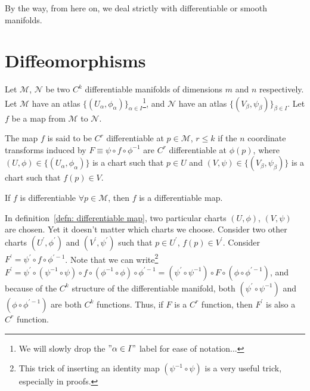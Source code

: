     By the way, from here on, we deal strictly with differentiable or smooth manifolds.
  \section{Diffeomorphisms}
    \label{sec: Diffeomorphism}
    \begin{definition}
      \label{defn: differentiable map}
      Let $\mathcal{M}$, $\mathcal{N}$ be two $C^k$ differentiable
      manifolds of dimensions $m$ and $n$ respectively. Let $\mathcal{M}$
      have an atlas $\{(U_\alpha, \phi_\alpha)\}_{\alpha\in I}$\footnote{We
      will slowly drop the $"\alpha\in I"$ label for ease of notation...},
      and $\mathcal{N}$ have an atlas $\{(V_\beta, \psi_\beta)\}_{\beta\in
      I}$. Let $f$ be a map from $\mathcal{M}$ to $\mathcal{N}$.
      
      The map $f$ is said to be $C^r$ differentiable at $p\in\mathcal{M}$,
      $r\leq k$ if the $n$ coordinate transforms induced by $F \equiv \psi
      \circ f \circ \phi^{-1}$ are $C^r$ differentiable at $\phi(p)$, where
      $(U,\phi) \in \{(U_\alpha, \phi_\alpha)\}$ is a chart such that $p
      \in U$ and $(V,\psi) \in \{(V_\beta, \psi_\beta)\}$ is a chart such
      that $f(p) \in V$.
      
      If $f$ is differentiable $\forall p \in \mathcal{M}$, then $f$ is a
      differentiable map.
    \end{definition}
    \begin{remark}
      In definition~\ref{defn: differentiable map}, two particular charts
      $(U,\phi)$, $(V,\psi)$ are chosen. Yet it doesn't matter which charts
      we choose. Consider two other charts $(U^\prime,\phi^\prime)$ and
      $(V^\prime,\psi^\prime)$ such that $p \in U^\prime$, $f(p) \in
      V^\prime$. Consider $F^\prime = \psi^\prime \circ f \circ
      \phi^{\prime -1}$. Note that we can write\footnote{This trick of
      inserting an identity map $(\psi^{-1} \circ \psi)$ is a very useful
      trick, especially in proofs.} $F^\prime = \psi^\prime \circ
      (\psi^{-1} \circ \psi) \circ f \circ (\phi^{-1} \circ \phi) \circ
      \phi^{\prime -1} = (\psi^\prime \circ \psi^{-1}) \circ F \circ (\phi
      \circ \phi^{\prime -1})$, and because of the $C^k$ structure of the
      differentiable manifold, both $(\psi^\prime \circ \psi^{-1})$ and
      $(\phi \circ \phi^{\prime -1})$ are both $C^k$ functions. Thus, if
      $F$ is a $C^r$ function, then $F^\prime$ is also a $C^r$ function.
    \end{remark}
